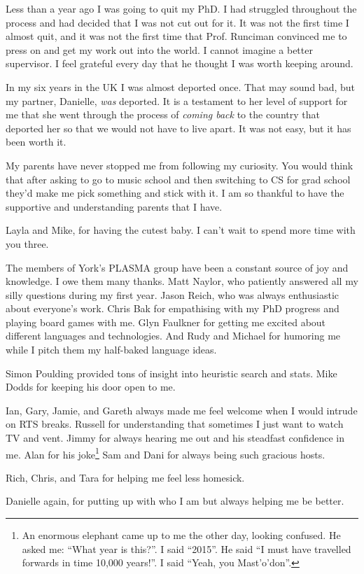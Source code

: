 Less than a year ago I was going to quit my PhD. I had struggled throughout the
process and had decided that I was not cut out for it. It was not the first
time I almost quit, and it was not the first time that Prof. Runciman convinced
me to press on and get my work out into the world. I cannot imagine a better
supervisor. I feel grateful every day that he thought I
was worth keeping around.

In my six years in the UK I was almost deported once. That may sound bad, but
my partner, Danielle, \emph{was} deported. It is a testament to her level of
support for me that she went through the process of \emph{coming back} to the
country that deported her so that we would not have to live apart. It was not
easy, but it has been worth it.

My parents have never stopped me from following my curiosity. You would think
that after asking to go to music school and then switching to CS for grad
school they'd make me pick something and stick with it. I am so thankful to
have the supportive and understanding parents that I have.

Layla and Mike, for having the cutest baby. I can't wait to spend more time
with you three.

The members of York's PLASMA group have been a constant source of joy and
knowledge. I owe them many thanks. Matt Naylor, who patiently answered all my
silly questions during my first year. Jason Reich, who was always enthusiastic
about everyone's work. Chris Bak for empathising with my PhD progress and
playing board games with me. Glyn Faulkner for getting me excited about
different languages and technologies. And Rudy and Michael for humoring me
while I pitch them my half-baked language ideas.

Simon Poulding provided tons of insight into heuristic search and stats. Mike Dodds
for keeping his door open to me.

Ian, Gary, Jamie, and Gareth always made me feel welcome when I would intrude
on RTS breaks. Russell for understanding that sometimes I just want to watch TV
and vent. Jimmy for always hearing me out and his steadfast confidence in me.
Alan for his joke\footnote{An enormous elephant came up to me the other day,
looking confused.  He asked me: ``What year is this?''. I said ``2015''. He
said ``I must have travelled forwards in time 10,000 years!''. I said ``Yeah,
you Mast'o'don''.} Sam and Dani for always being such gracious hosts.

Rich, Chris, and Tara for helping me feel less homesick.

Danielle again, for putting up with who I am but always helping me be better.
